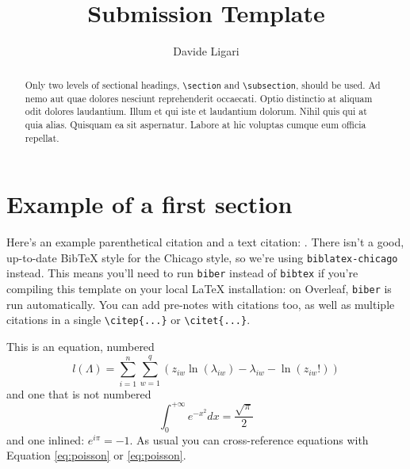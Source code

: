 \documentclass{class}
\title{Submission Template }
\author[1]{Davide Ligari}
\affil[1]{University of Pavia, Department of Computer Engineering (Data Science), Pavia, Italy.\newline Email: \url{davide.ligari01@universitadipavia.it}}
\begin{document}
\maketitle

\begin{abstract}
  Only two levels of sectional headings, \verb|\section| and \verb|\subsection|, should be used. Ad nemo aut quae dolores nesciunt reprehenderit occaecati. Optio distinctio at aliquam odit dolores laudantium. Illum et qui iste et laudantium dolorum. Nihil quis qui at quia alias. Quisquam ea sit aspernatur. Labore at hic voluptas cumque eum officia repellat.

\end{abstract}

\section{Example of a first section}
\label{sec:overview}

Here's an example parenthetical citation \citep{lees2010theoretical} and a text citation: \citet{urmson2008autonomous}. There isn't a good, up-to-date BibTeX style for the Chicago style, so we're using \texttt{biblatex-chicago} instead. This means you'll need to run \texttt{biber} instead of \texttt{bibtex} if you're compiling this template on your local \LaTeX{} installation: on Overleaf, \texttt{biber} is run automatically. You can add pre-notes with citations \citep[see also][]{urmson2008autonomous} too, as well as multiple citations \citep{geiger2012we,leesother} in a single \verb|\citep{...}| or \verb|\citet{...}|.

This is an equation, numbered
\begin{equation}
  l(\Lambda)=\sum_{i=1}^{n} \sum_{w=1}^{q} (z_{i w} \ln (\lambda_{i w}) - \lambda_{i w} - \ln (z_{i w}!))
  \label{eq:poisson}
\end{equation}
and one that is not numbered
\begin{equation*}
  \int_0^{+\infty}e^{-x^2}dx=\frac{\sqrt{\pi}}{2}
\end{equation*}
and one inlined: $e^{i\pi}=-1$. As usual you can cross-reference equations with Equation \ref{eq:poisson} or \eqref{eq:poisson}.
\end{document}
